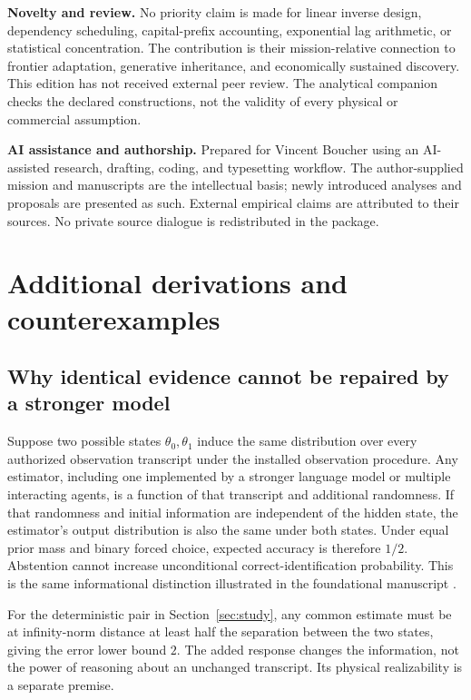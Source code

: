 \documentclass[11pt,letterpaper]{article}
\theoremstyle{remark}\newtheorem{remark}{Remark}[section]
\begin{document}
\textbf{Novelty and review.} No priority claim is made for linear inverse design, dependency scheduling, capital-prefix accounting, exponential lag arithmetic, or statistical concentration. The contribution is their mission-relative connection to frontier adaptation, generative inheritance, and economically sustained discovery. This edition has not received external peer review. The analytical companion checks the declared constructions, not the validity of every physical or commercial assumption.

\textbf{AI assistance and authorship.} Prepared for Vincent Boucher using an AI-assisted research, drafting, coding, and typesetting workflow. The author-supplied mission and manuscripts are the intellectual basis; newly introduced analyses and proposals are presented as such. External empirical claims are attributed to their sources. No private source dialogue is redistributed in the package.

\section{Additional derivations and counterexamples}
\label{app:derivations}
\subsection{Why identical evidence cannot be repaired by a stronger model}
Suppose two possible states $\theta_0,\theta_1$ induce the same distribution over every authorized observation transcript under the installed observation procedure. Any estimator, including one implemented by a stronger language model or multiple interacting agents, is a function of that transcript and additional randomness. If that randomness and initial information are independent of the hidden state, the estimator's output distribution is also the same under both states. Under equal prior mass and binary forced choice, expected accuracy is therefore $1/2$. Abstention cannot increase unconditional correct-identification probability. This is the same informational distinction illustrated in the foundational manuscript \citep{transform}.

For the deterministic pair in Section~\ref{sec:study}, any common estimate must be at infinity-norm distance at least half the separation between the two states, giving the error lower bound $2$. The added response changes the information, not the power of reasoning about an unchanged transcript. Its physical realizability is a separate premise.
\end{document}
